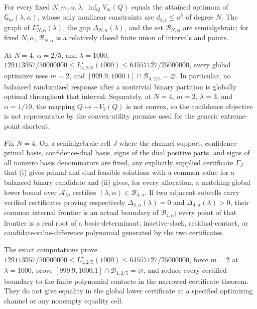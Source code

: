 For every fixed \(N,m,\alpha,\lambda\), \(\inf_QV_m(Q)\) equals the attained optimum of \(\mathsf G_m(\lambda,\alpha)\), whose only nonlinear constraints are \(d_{h,t}\le a^h\) of degree \(N\). The graph of \(L^\star_{N,\alpha}(\lambda)\), the gap \(\Delta_{N,\alpha}(\lambda)\), and the set \(\mathcal B_{N,\alpha}\) are semialgebraic; for fixed \(N,\alpha\), \(\mathcal B_{N,\alpha}\) is a relatively closed finite union of intervals and points.

At \(N=4\), \(\alpha=2/5\), and \(\lambda=1000\), \(129113957/50000000\le L^\star_{4,2/5}(1000)\le64557127/25000000\), every global optimizer uses \(m=2\), and \([999.9,1000.1]\cap\mathcal B_{4,2/5}=\varnothing\). In particular, no balanced randomized response after a nontrivial binary partition is globally optimal throughout that interval. Separately, at \(N=4\), \(m=2\), \(\lambda=3\), and \(\alpha=1/10\), the mapping \(Q\mapsto-V_2(Q)\) is not convex, so the confidence objective is not representable by the convex-utility premise used for the generic extreme-point shortcut.

Fix \(N=4\).  On a semialgebraic cell \(J\) where the channel support, confidence-primal basis, confidence-dual basis, signs of the dual positive parts, and signs of all nonzero basis denominators are fixed, any explicitly supplied certificate \(\Gamma_J\) that (i) gives primal and dual feasible solutions with a common value for a balanced binary candidate and (ii) gives, for every allocation, a matching global lower bound over \(\mathcal A_\lambda\), certifies \((\lambda,\alpha)\in\mathcal B_{4,\alpha}\).  If two adjacent subcells carry verified certificates proving respectively \(\Delta_{4,\alpha}(\lambda)=0\) and \(\Delta_{4,\alpha}(\lambda)>0\), their common internal frontier is an actual boundary of \(\mathcal B_{4,\alpha}\); every point of that frontier is a real root of a basis-determinant, inactive-slack, residual-contact, or candidate-value-difference polynomial generated by the two certificates.

The exact computations prove \(129113957/50000000\le L^\star_{4,2/5}(1000)\le64557127/25000000\), force \(m=2\) at \(\lambda=1000\), prove \([999.9,1000.1]\cap\mathcal B_{4,2/5}=\varnothing\), and reduce every certified boundary to the finite polynomial contacts in the narrowed certificate theorem.  They do not give equality in the global lower certificate at a specified optimizing channel or any nonempty equality cell.
